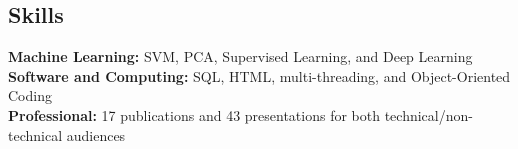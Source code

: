 \documentclass[margin,line, 12pt]{res}
\newenvironment{list2}{
  \begin{list}{$\bullet$}{%
      \setlength{\itemsep}{0.04in}
      \setlength{\parsep}{0.00in} \setlength{\parskip}{0in}
      \setlength{\topsep}{0.0in} \setlength{\partopsep}{0in}
      \setlength{\leftmargin}{0.2in}}}{\end{list}}
\begin{document}
\begin{spacing}{0.98}
\begin{resume}


\section{Skills}
\textbf{Machine Learning:} SVM, PCA, Supervised Learning, and Deep Learning\\ 
\textbf{Software and Computing:} SQL, HTML, multi-threading, and Object-Oriented Coding \\
\textbf{Professional:} 17 publications and 43 presentations for both technical/non-technical audiences
\vspace*{-3mm}


\end{resume}
\end{spacing}
\end{document}
